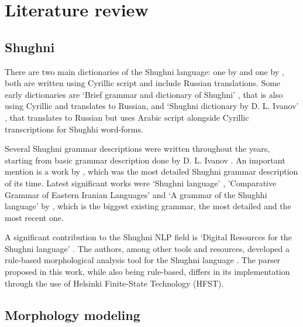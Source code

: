 \section{Literature review}
\subsection{Shughni}
\par There are two main dictionaries of the Shughni language: one by \textcite{zarubin_dict_1960} and one by \textcite{karamshoev_dict_1988}, both are written using Cyrillic script and include Russian translations. Some early dictionaries are `Brief grammar and dictionary of Shughni' \parencite{tumanovich_gram_1906}, that is also using Cyrillic and translates to Russian, and `Shughni dictionary by D. L. Ivanov' \parencite{salemann_dict_1895}, that translates to Russian but uses Arabic script alongside Cyrillic transcriptions for Shughhi word-forms.
\par Several Shughni grammar descriptions were written throughout the years, starting from basic grammar description done by D. L. Ivanov \parencite[274-281]{salemann_dict_1895}. An important mention is a work by \textcite{karamshoev_dialect_1963}, which was the most detailed Shughni grammar description of its time. Latest significant works were `Shughni language' \parencite[225-242]{edelman_languages_1999}, 'Comparative Grammar of Eastern Iranian Languages' \parencite{edelman_gram_2009} and `A grammar of the Shughhi language' by \textcite{parker_shughni_2023}, which is the biggest existing grammar, the most detailed and the most recent one.
\par A significant contribution to the Shughni NLP field is `Digital Resources for the Shughni language' \parencite{makarov_digital_2022}. The authors, among other tools and resources, developed a rule-based morphological analysis tool for the Shughni language \textcite{melchenko_2021_parser}. The parser proposed in this work, while also being rule-based, differs in its implementation through the use of Helsinki Finite-State Technology (HFST).

\subsection{Morphology modeling}
